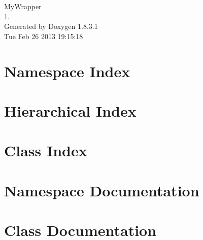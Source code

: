\documentclass{book}
\begin{document}
\hypersetup{pageanchor=false,citecolor=blue}
\begin{titlepage}
\vspace*{7cm}
\begin{center}
{\Large My\-Wrapper \\[1ex]\large 1. }\\
\vspace*{1cm}
{\large Generated by Doxygen 1.8.3.1}\\
\vspace*{0.5cm}
{\small Tue Feb 26 2013 19:15:18}\\
\end{center}
\end{titlepage}
\clearemptydoublepage
{}
\tableofcontents
\clearemptydoublepage
{}
\hypersetup{pageanchor=true,citecolor=blue}
\chapter{Namespace Index}

\chapter{Hierarchical Index}

\chapter{Class Index}

\chapter{Namespace Documentation}

\chapter{Class Documentation}
















































\printindex
\end{document}
